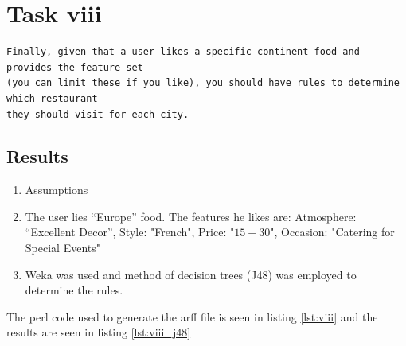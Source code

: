 \documentclass[letterpaper,10pt]{article}
\begin{document}

\clearpage
\newpage
\section*{Task viii}
\begin{verbatim}
Finally, given that a user likes a specific continent food and provides the feature set
(you can limit these if you like), you should have rules to determine which restaurant
they should visit for each city.
\end{verbatim}
\subsection*{Results}
\begin{enumerate}
\item[] Assumptions
\item The user lies “Europe” food. The features he likes are: 
Atmosphere: “Excellent Decor”,
Style: "French",
Price: "$15-$30",
Occasion: "Catering for Special Events"
\item Weka was used and method of decision trees (J48) was employed to determine the rules.
\end{enumerate}
The perl code used to generate the arff file is seen in listing \hyperref[lst:viii]{\ref{lst:viii}} and the results are seen in listing \hyperref[lst:viii_j48]{\ref{lst:viii_j48}}

\clearpage
\newpage
\end{document}

